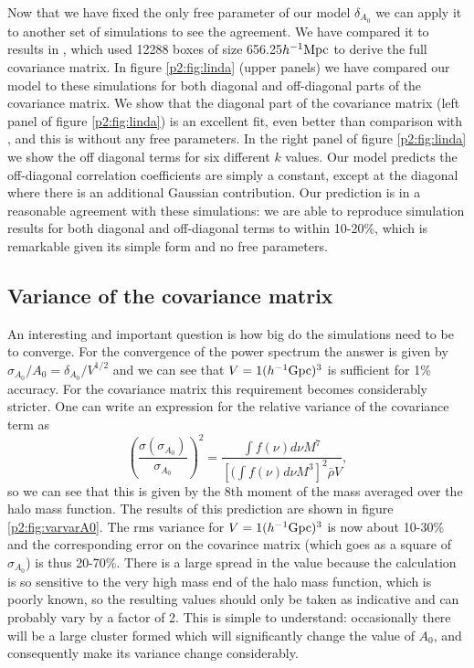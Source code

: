 \documentclass[
  11pt,
  twoside,
  openright,
  titlepage,
  headings=optiontoheadandtoc
]{scrbook}
\begin{document}
Now that we have fixed the only free parameter of our model $\delta_{A_0}$ 
we can apply it to another set of simulations to see 
the agreement. We have compared it to results in \cite{2014arXiv1406.2713B}, which 
used 12288 boxes of size 656.25$h^{-1} \rm{Mpc}$ to derive the full covariance matrix.  
In figure \ref{p2:fig:linda} (upper panels) we have compared our model to these simulations 
for both diagonal and off-diagonal parts of the covariance matrix.
We show that 
the diagonal part of the covariance matrix (left panel of figure \ref{p2:fig:linda}) is an excellent fit, even 
better than comparison with \cite{2014PhRvD..89h3519L}, and this is without any free parameters. 
In the right panel of figure \ref{p2:fig:linda} we show the off diagonal terms for six different $k$ values. 
Our model predicts the off-diagonal correlation coefficients are simply a constant, except at the diagonal where 
there is an additional Gaussian contribution. 
Our prediction is in a reasonable agreement with these simulations: 
we are able to reproduce simulation results for both diagonal and off-diagonal terms to within 10-20\%, which is 
remarkable given its simple form and no free parameters. 
 
\subsection{Variance of the covariance matrix}

An interesting and important question is how big do the simulations need to be to converge. For the convergence of 
the power spectrum the answer is given by $\sigma_{A_0}/A_0=\delta_{A_0}/V^{1/2}$ and we can see that $V=1(h^{-1}{\rm Gpc})^3$
is sufficient for 1\% accuracy. For the covariance matrix this requirement becomes considerably stricter. One 
can write an expression for the relative variance of the covariance term as 
\begin{equation}
\left(\frac{\sigma(\sigma_{A_0})}{\sigma_{A_0}}\right)^2
=\frac{\int f(\nu)d\nu M^7}{[(\int f(\nu)d\nu M^3]^2\bar{\rho} V},
\end{equation}
so we can see that this is given by the 8th moment of the mass averaged over the halo mass function. 
The results of this prediction are shown in figure \ref{p2:fig:varvarA0}. 
The rms variance for $V=1(h^{-1}{\rm Gpc})^3$ is now about 10-30\% and the corresponding error on the 
covarince matrix (which goes as a square of $\sigma_{A_0}$) is thus 20-70\%. There is a large spread in the value because the 
calculation is so sensitive to the very high mass end of the halo mass function, which is poorly known, so the 
resulting values should only be taken as indicative and can probably vary by a factor of 2. This is simple to 
understand: occasionally there will be a large cluster formed which will significantly change the value of $A_0$, 
and consequently make its variance change considerably. 
\end{document}
